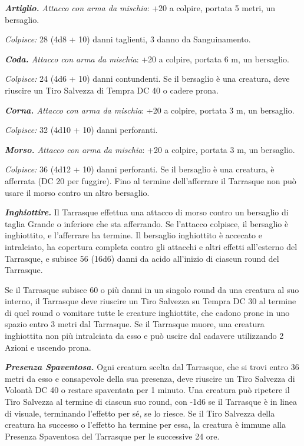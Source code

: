 \begin{multicols}{2}
{\emph{\textbf{Artiglio.} Attacco con arma da mischia}: +20 a colpire, portata 5 metri, un bersaglio.

\emph{Colpisce:} 28 (4d8 + 10) danni taglienti, 3 danno da Sanguinamento.

\emph{\textbf{Coda.} Attacco con arma da mischia}: +20 a colpire, portata 6 m, un bersaglio.

\emph{Colpisce:} 24 (4d6 + 10) danni contundenti. Se il bersaglio è una creatura, deve riuscire un Tiro Salvezza di Tempra DC 40 o cadere prona.

\emph{\textbf{Corna.} Attacco con arma da mischia}: +20 a colpire, portata 3 m, un bersaglio.

\emph{Colpisce:} 32 (4d10 + 10) danni perforanti.

\emph{\textbf{Morso.} Attacco con arma da mischia}: +20 a colpire, portata 3 m, un bersaglio.

\emph{Colpisce:} 36 (4d12 + 10) danni perforanti. Se il bersaglio è una creatura, è afferrata (DC 20 per fuggire). Fino al termine dell'afferrare il Tarrasque non può usare il morso contro un altro bersaglio.

\emph{\textbf{Inghiottire.}} Il Tarrasque effettua una attacco di morso contro un bersaglio di taglia Grande o inferiore che sta afferrando. Se l'attacco colpisce, il bersaglio è inghiottito, e l'afferrare ha termine. Il bersaglio inghiottito è accecato e intralciato, ha copertura completa contro gli attacchi e altri effetti all'esterno del Tarrasque, e subisce 56 (16d6) danni da acido all'inizio di ciascun round del Tarrasque.

Se il Tarrasque subisce 60 o più danni in un singolo round da una creatura al suo interno, il Tarrasque deve riuscire un Tiro Salvezza su Tempra DC 30 al termine di quel round o vomitare tutte le creature inghiottite, che cadono prone in uno spazio entro 3 metri dal Tarrasque. Se il Tarrasque muore, una creatura inghiottita non più intralciata da esso e può uscire dal cadavere utilizzando 2 Azioni e uscendo prona.

\emph{\textbf{Presenza Spaventosa.}} Ogni creatura scelta dal Tarrasque, che si trovi entro 36 metri da esso e consapevole della sua presenza, deve riuscire un Tiro Salvezza di Volontà DC 40 o restare spaventata per 1 minuto. Una creatura può ripetere il Tiro Salvezza al termine di ciascun suo round, con -1d6 se il Tarrasque è in linea di visuale, terminando l'effetto per sé, se lo riesce. Se il Tiro Salvezza della creatura ha successo o l'effetto ha termine per essa, la creatura è immune alla Presenza Spaventosa del Tarrasque per le successive 24 ore.

}
\end{multicols}
